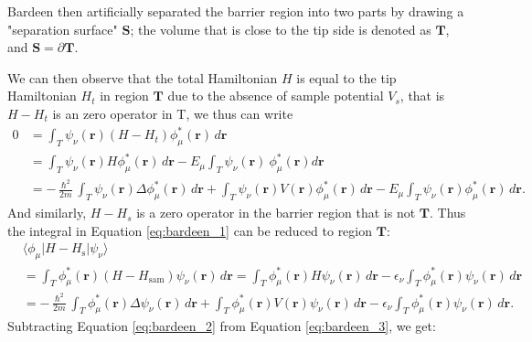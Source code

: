Bardeen then artificially separated the barrier region into two parts by drawing a "separation surface" $\mathbf{S}$; the volume that is close to the tip side is denoted as $\mathbf{T}$, and $\mathbf{S} = \partial \mathbf{T}$.

We can then observe that the total Hamiltonian $H$ is equal to the tip Hamiltonian $H_t$ in region $\mathbf{T}$ due to the absence of sample potential $V_s$, that is $H-H_t$ is an zero operator in T, we thus can write
\begin{equation}
	\label{eq:bardeen_2}
	\begin{aligned}
		0 &= \int_{T}  \psi_{\nu}(\mathbf{r}) \left( H - H_{t} \right) \phi_{\mu}^*(\mathbf{r})  \, d\mathbf{r} \\
		&= \int_{T} \psi_{\nu}(\mathbf{r}) H \phi_{\mu}^*(\mathbf{r})  \, d\mathbf{r} 
		- E_{\mu} \int_{T}   \psi_{\nu}(\mathbf{r})\ \phi_{\mu}^*(\mathbf{r}) d\mathbf{r} \\
		&= -\frac{\hslash^2}{2m} \int_{T}   \psi_{\nu}(\mathbf{r}) \Delta \phi_{\mu}^*(\mathbf{r}) \, d\mathbf{r} 
		+ \int_{T} \psi_{\nu}(\mathbf{r}) V(\mathbf{r}) \phi_{\mu}^*(\mathbf{r}) \, d\mathbf{r} 
		- E_{\mu} \int_{T}  \psi_{\nu}(\mathbf{r}) \phi_{\mu}^*(\mathbf{r})\, d\mathbf{r}.
	\end{aligned}
\end{equation}
And similarly, $H - H_s$ is a zero operator in the barrier region that is not $\mathbf{T}$. Thus the integral in Equation \ref{eq:bardeen_1} can be reduced to region $\mathbf{T}$:   
\begin{equation}
	\label{eq:bardeen_3}
	\begin{aligned}
		&\langle \phi_{\mu} | H - H_{\text{s}} | \psi_{\nu} \rangle \\
		&= \int_{T} \phi_{\mu}^*(\mathbf{r}) \left( H - H_{\text{sam}} \right) \psi_{\nu}(\mathbf{r}) \, d\mathbf{r} 
		= \int_{T} \phi_{\mu}^*(\mathbf{r}) H \psi_{\nu}(\mathbf{r}) \, d\mathbf{r} 
		- \epsilon_{\nu} \int_{T} \phi_{\mu}^*(\mathbf{r}) \psi_{\nu}(\mathbf{r}) \, d\mathbf{r} \\
		&= -\frac{\hslash^2}{2m} \int_{T} \phi_{\mu}^*(\mathbf{r}) \Delta \psi_{\nu}(\mathbf{r}) \, d\mathbf{r} 
		+ \int_{T} \phi_{\mu}^*(\mathbf{r}) V(\mathbf{r}) \psi_{\nu}(\mathbf{r}) \, d\mathbf{r} 
		- \epsilon_{\nu} \int_{T} \phi_{\mu}^*(\mathbf{r}) \psi_{\nu}(\mathbf{r}) \, d\mathbf{r}.
	\end{aligned}
\end{equation}
Subtracting Equation \ref{eq:bardeen_2} from Equation \ref{eq:bardeen_3}, we get: 
